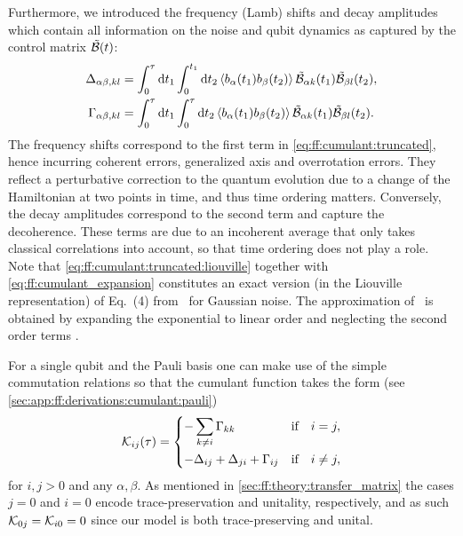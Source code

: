 Furthermore, we introduced the frequency (Lamb) shifts \freqshifts and decay amplitudes \decayamps which contain all information on the noise and qubit dynamics as captured by the control matrix $\tilde{\mathcal{B}}(t)$:
\begin{align}
    \Delta_{\alpha\beta,kl} &= \int_0^\tau\dd{t_1}\int_0^{t_1}\dd{t_2}\expval{b_\alpha(t_1) b_\beta(t_2)}\tilde{\mathcal{B}}_{\alpha k}(t_1)\tilde{\mathcal{B}}_{\beta l}(t_2), \label{eq:ff:frequency_shift:time} \\
    \Gamma_{\alpha\beta,kl} &= \int_0^\tau\dd{t_1}\int_0^\tau\dd{t_2}\expval{b_\alpha(t_1) b_\beta(t_2)}\tilde{\mathcal{B}}_{\alpha k}(t_1)\tilde{\mathcal{B}}_{\beta l}(t_2).  \label{eq:ff:decay_amplitudes:time}
\end{align}
The frequency shifts \freqshifts correspond to the first term in \cref{eq:ff:cumulant:truncated}, hence incurring coherent errors, \ie generalized axis and overrotation errors.
They reflect a perturbative correction to the quantum evolution due to a change of the Hamiltonian at two points in time, and thus time ordering matters.
Conversely, the decay amplitudes \decayamps correspond to the second term and capture the decoherence.
These terms are due to an incoherent average that only takes classical correlations into account, so that time ordering does not play a role.
Note that \cref{eq:ff:cumulant:truncated:liouville} together with \cref{eq:ff:cumulant_expansion} constitutes an exact version (in the Liouville representation) of Eq.~(4) from~ for Gaussian noise.
The approximation of~ is obtained by expanding the exponential to linear order and neglecting the second order terms \freqshifts.

For a single qubit and \basis the Pauli basis one can make use of the simple commutation relations so that the cumulant function takes the form (see \cref{sec:app:ff:derivations:cumulant:pauli})
\begin{equation}\label{eq:ff:cumulant:truncated:liouville:pauli}
\cumulantfun_{ij}(\tau) = \begin{dcases}
    - \sum_{k\neq i}\decayamps_{kk}                         &\qif* i = j,   \\
    - \freqshifts_{ij} + \freqshifts_{ji} + \decayamps_{ij} &\qif* i\neq j,
\end{dcases}
\end{equation}
for $i,j > 0$ and any $\alpha,\beta$.
As mentioned in \cref{sec:ff:theory:transfer_matrix} the cases $j = 0$ and $i = 0$ encode trace-preservation and unitality, respectively, and as such $\mathcal{K}_{0j} = \mathcal{K}_{i0} = 0$ since our model is both trace-preserving and unital.

